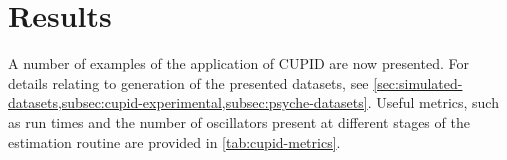 \section{Results}
\label{subsec:cupid-results}

A number of examples of the application of \ac{CUPID} are now presented.
For details relating to generation of the presented datasets, see
\cref{sec:simulated-datasets,subsec:cupid-experimental,subsec:psyche-datasets}.
Useful metrics, such as run times and the number of oscillators present at
different stages of the estimation routine are provided in
\cref{tab:cupid-metrics}.

